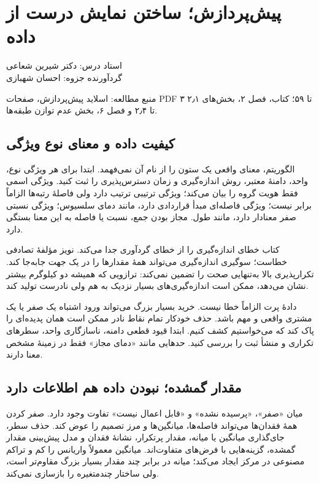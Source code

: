 \documentclass[12pt,a4paper,oneside]{report}
\newcommand{\source}[1]{\par{\small\color{muted} منبع مطالعه: #1}\par}
\begin{document}
\setcounter{chapter}{1}
\chapter{پیش‌پردازش؛ ساختن نمایش درست از داده}
\begin{center}{\small\color{muted} استاد درس: دکتر شیرین شعاعی\\[2mm] گردآورنده جزوه: احسان شهبازی}\end{center}

\source{اسلاید پیش‌پردازش، صفحات PDF ۳ تا ۵۹؛ کتاب، فصل ۲، بخش‌های ۲٫۱ تا ۲٫۴ و فصل ۶، بخش عدم توازن طبقه‌ها.}

\section{کیفیت داده و معنای نوع ویژگی}
الگوریتم، معنای واقعی یک ستون را از نام آن نمی‌فهمد. ابتدا برای هر ویژگی نوع، واحد، دامنهٔ معتبر، روش اندازه‌گیری و زمان دسترس‌پذیری را ثبت کنید. ویژگی اسمی  فقط هویت گروه را بیان می‌کند؛ ویژگی ترتیبی  ترتیب دارد ولی فاصلهٔ رتبه‌ها الزاماً برابر نیست؛ ویژگی فاصله‌ای مبدأ قراردادی دارد، مانند دمای سلسیوس؛ ویژگی نسبتی صفر معنادار دارد، مانند طول. مجاز بودن جمع، نسبت یا فاصله به این معنا بستگی دارد.

کتاب خطای اندازه‌گیری را از خطای گردآوری جدا می‌کند. نویز مؤلفهٔ تصادفی خطاست؛ سوگیری اندازه‌گیری می‌تواند همهٔ مقدارها را در یک جهت جابه‌جا کند. تکرارپذیری بالا به‌تنهایی صحت را تضمین نمی‌کند: ترازویی که همیشه دو کیلوگرم بیشتر نشان می‌دهد، ممکن است اندازه‌گیری‌های بسیار نزدیک به هم ولی نادرست تولید کند.

دادهٔ پرت  الزاماً خطا نیست. خرید بسیار بزرگ می‌تواند ورود اشتباه یک صفر یا یک مشتری واقعی و مهم باشد. حذف خودکار تمام نقاط نادر ممکن است همان پدیده‌ای را پاک کند که می‌خواستیم کشف کنیم. ابتدا قیود قطعی دامنه، ناسازگاری واحد، سطرهای تکراری و منشأ ثبت را بررسی کنید. حدهایی مانند «دمای مجاز» فقط در زمینهٔ مشخص معنا دارند.

\section{مقدار گمشده؛ نبودن داده هم اطلاعات دارد}
میان «صفر»، «پرسیده نشده» و «قابل اعمال نیست» تفاوت وجود دارد. صفر کردن همهٔ فقدان‌ها می‌تواند فاصله‌ها، میانگین‌ها و مرز تصمیم را عوض کند. حذف سطر، جای‌گذاری میانگین یا میانه، مقدار پرتکرار، نشانهٔ فقدان و مدل پیش‌بینی مقدار گمشده، گزینه‌هایی با فرض‌های متفاوت‌اند. میانگین معمولاً واریانس را کم و تراکم مصنوعی در مرکز ایجاد می‌کند؛ میانه در برابر چند مقدار بسیار بزرگ مقاوم‌تر است، ولی ساختار چندمتغیره را بازسازی نمی‌کند.
\end{document}
